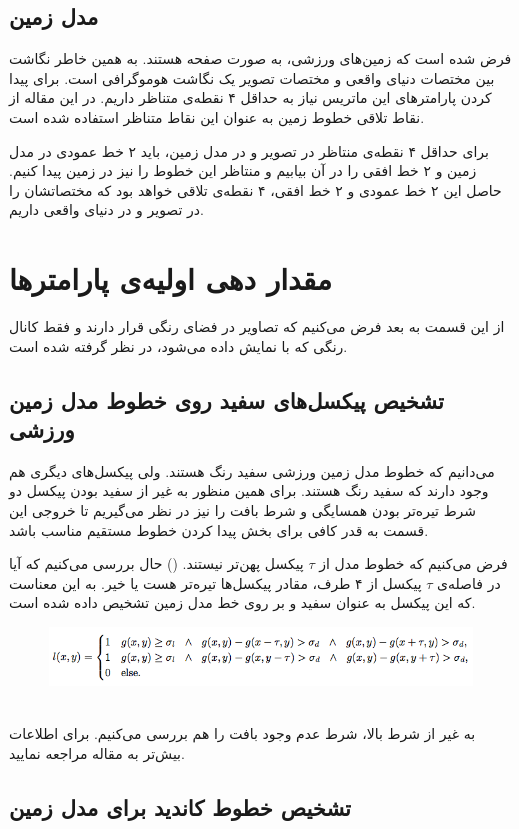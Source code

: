 \documentclass{report}
\begin{document}
\subsection{مدل زمین}
فرض شده است که زمین‌های ورزشی، به صورت صفحه هستند. به همین خاطر نگاشت بین مختصات دنیای واقعی و مختصات تصویر یک نگاشت هوموگرافی است. برای پیدا کردن پارامترهای این ماتریس نیاز به حداقل ۴ نقطه‌ی متناظر داریم. در این مقاله از نقاط تلاقی خطوط زمین به عنوان این نقاط متناظر استفاده شده است.

برای حداقل ۴ نقطه‌ی منتاظر در تصویر و در مدل زمین، باید ۲ خط عمودی در مدل زمین و ۲ خط افقی را در آن بیابیم و منتاظر این خطوط را نیز در زمین پیدا کنیم. حاصل این ۲ خط عمودی و ۲ خط افقی، ۴ نقطه‌ی تلاقی خواهد بود که مختصاتشان را در تصویر و در دنیای واقعی داریم.
\section{مقدار دهی اولیه‌ی پارامترها}
از این قسمت به بعد فرض می‌کنیم که تصاویر در فضای رنگی  قرار دارند و فقط کانال رنگی  که با \textit{} نمایش داده می‌شود، در نظر گرفته شده است.
\subsection{تشخیص پیکسل‌های سفید روی خطوط مدل زمین ورزشی}
می‌دانیم که خطوط مدل زمین ورزشی سفید رنگ هستند. ولی پیکسل‌های دیگری هم وجود دارند که سفید رنگ هستند. برای همین منظور به غیر از سفید بودن پیکسل دو شرط تیره‌تر بودن همسایگی و شرط بافت را نیز در نظر می‌گیریم تا خروجی این قسمت به قدر کافی برای بخش پیدا کردن خطوط مستقیم مناسب باشد.

فرض می‌کنیم که خطوط مدل از $\tau$ پیکسل پهن‌تر نیستند. (\textit{}) حال بررسی می‌کنیم که آیا در فاصله‌ی $\tau$ پیکسل از ۴ طرف، مقادر پیکسل‌ها تیره‌تر هست یا خیر. \textit{} به این معناست که این پیکسل به عنوان سفید و بر روی خط مدل زمین تشخیص داده شده است.
\begin{figure}
\centering
\includegraphics[scale=0.6]{wpixle.png}
\label{wpixle}
\end{figure}
\\

به غیر از شرط بالا، شرط عدم وجود بافت را هم بررسی می‌کنیم. برای اطلاعات بیش‌تر به مقاله مراجعه نمایید.
\subsection{تشخیص خطوط کاندید برای مدل زمین}
\end{document}
